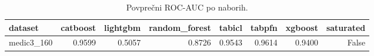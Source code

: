 \begin{table}[htbp]
\centering
\caption{Povprečni ROC-AUC po naborih.}
\label{tab:pivot}
\begin{tabular}{lrrrrrrr}
\hline
dataset & catboost & lightgbm & random\_forest & tabicl & tabpfn & xgboost & saturated \\
\hline
medic3\_160 & 0.9599 & 0.5057 & 0.8726 & 0.9543 & 0.9614 & 0.9400 & False \\
\hline
\end{tabular}
\end{table}
